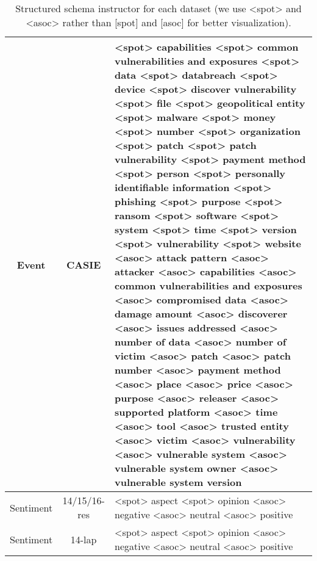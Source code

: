 \documentclass[11pt]{article}
\begin{document}
\begin{table*}[htbp]
{\begin{tabular}{ccp{12cm}}
\midrule
Event & CASIE & <spot> capabilities <spot> common vulnerabilities and exposures <spot> data <spot> databreach <spot> device <spot> discover vulnerability <spot> file <spot> geopolitical entity <spot> malware <spot> money <spot> number <spot> organization <spot> patch <spot> patch vulnerability <spot> payment method <spot> person <spot> personally identifiable information <spot> phishing <spot> purpose <spot> ransom <spot> software <spot> system <spot> time <spot> version <spot> vulnerability <spot> website <asoc> attack pattern <asoc> attacker <asoc> capabilities <asoc> common vulnerabilities and exposures <asoc> compromised data <asoc> damage amount <asoc> discoverer <asoc> issues addressed <asoc> number of data <asoc> number of victim <asoc> patch <asoc> patch number <asoc> payment method <asoc> place <asoc> price <asoc> purpose <asoc> releaser <asoc> supported platform <asoc> time <asoc> tool <asoc> trusted entity <asoc> victim <asoc> vulnerability <asoc> vulnerable system <asoc> vulnerable system owner <asoc> vulnerable system version \\
\midrule
Sentiment & 14/15/16-res & <spot> aspect <spot> opinion <asoc> negative <asoc> neutral <asoc> positive \\
\midrule
Sentiment & 14-lap & <spot> aspect <spot> opinion <asoc> negative <asoc> neutral <asoc> positive \\
\bottomrule
\end{tabular}

}
  \caption{Structured schema instructor for each dataset (we use <spot> and <asoc> rather than [spot] and [asoc] for better visualization).}
  \label{tab:addlabel}\end{table*}
\end{document}

